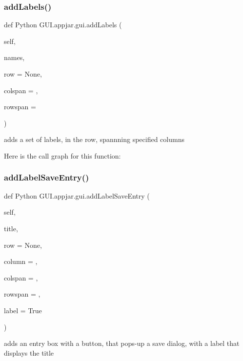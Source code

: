 \subsubsection{\texorpdfstring{add\+Labels()}{addLabels()}}
{\footnotesize\ttfamily def Python G\+U\+I.\+appjar.\+gui.\+add\+Labels (\begin{DoxyParamCaption}\item[{}]{self,  }\item[{}]{names,  }\item[{}]{row = {\ttfamily None},  }\item[{}]{colspan = {},  }\item[{}]{rowspan = {} }\end{DoxyParamCaption})}

\begin{DoxyVerb}adds a set of labels, in the row, spannning specified columns \end{DoxyVerb}
 Here is the call graph for this function\+:
\mbox{\label{class_python_01_g_u_i_1_1appjar_1_1gui_aaa0ff835e828bb6fdb9ed8eaefd5f5b6}} 
\subsubsection{\texorpdfstring{add\+Label\+Save\+Entry()}{addLabelSaveEntry()}}
{\footnotesize\ttfamily def Python G\+U\+I.\+appjar.\+gui.\+add\+Label\+Save\+Entry (\begin{DoxyParamCaption}\item[{}]{self,  }\item[{}]{title,  }\item[{}]{row = {\ttfamily None},  }\item[{}]{column = {},  }\item[{}]{colspan = {},  }\item[{}]{rowspan = {},  }\item[{}]{label = {\ttfamily True} }\end{DoxyParamCaption})}

\begin{DoxyVerb}adds an entry box with a button, that pops-up a save dialog, with a label that displays the title \end{DoxyVerb}
 \mbox{\label{class_python_01_g_u_i_1_1appjar_1_1gui_a7c00d0c50fa34004e61500001abc4e76}} 
